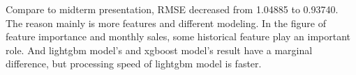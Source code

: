 \documentclass{tikzposter} %
\begin{document}
\begin{columns}
{
 Compare to midterm presentation, RMSE decreased from 1.04885 to 0.93740. The reason mainly is more features and different modeling. In the figure of feature importance and monthly sales, some historical feature play an important role. And lightgbm model's and xgboost model's result have a marginal difference, but processing speed of lightgbm model is faster.

}





\end{columns}



\end{document}
